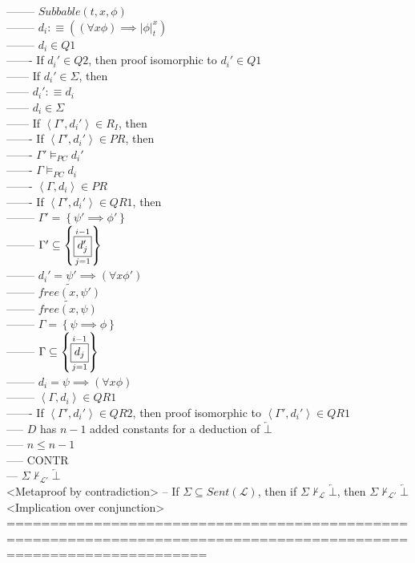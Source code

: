 \documentclass{book}
\newcommand{\is}{:\equiv}
\newcommand{\pnot}[1]{\widetilde{#1}}
\newcommand{\inot}{\not}
\newcommand{\contr}{\overleftarrow{\bot}}
\newcommand{\free}[2]{free(#1, #2)}
\newcommand{\set}[1]{\left\{ #1 \right\}}
\newcommand{\seq}[1]{\left\langle #1 \right\rangle}
\newcommand{\vdc}[3]{\underset{#2}{\overset{#3}{\fbox{$#1$}}}}
\newcommand{\sub}[3]{\left|#1\right|_{#3}^{#2}}
\begin{document}
								-------- $Subbable(t, x, \phi)$ \\
								-------- $d_i \is ((\forall x \phi) \implies \sub{\phi}{x}{t})$ \\
								-------- $d_i \in Q1$ \\
							------- If $d_i' \in Q2$, then proof isomorphic to $d_i' \in Q1$ \\
						------ If $d_i' \in \Sigma$, then \\
						------ $d_i' \is d_i$ \\
						------ $d_i \in \Sigma$ \\
						------ If $\seq{\Gamma', d_i'} \in R_I$, then \\
							------- If $\seq{\Gamma', d_i'} \in PR$, then \\
							------- $\Gamma' \vDash_{PC} d_i'$ \\
							------- $\Gamma \vDash_{PC} d_i$ \\
							------- $\seq{\Gamma, d_i} \in PR$ \\
							------- If $\seq{\Gamma', d_i'} \in QR1$, then \\
								-------- $\Gamma' = \set{\psi' \implies \phi'}$ \\
								-------- $\Gamma' \subseteq \set{\vdc{d_j'}{j=1}{i-1}}$ \\
								-------- $d_i' = \psi' \implies (\forall x \phi')$ \\
								-------- $\pnot{\free{x}{\psi'}}$ \\
								-------- $\pnot{\free{x}{\psi}}$ \\
								-------- $\Gamma = \set{\psi \implies \phi}$ \\
								-------- $\Gamma \subseteq \set{\vdc{d_j}{j=1}{i-1}}$ \\
								-------- $d_i = \psi \implies (\forall x \phi)$ \\
								-------- $\seq{\Gamma, d_i} \in QR1$ \\
							------- If $\seq{\Gamma', d_i'} \in QR2$, then proof isomorphic to $\seq{\Gamma', d_i'} \in QR1$ \\
					----- $D$ has $n-1$ added constants for a deduction of $\contr$ \\
					----- $n \leq n-1$ \\
					----- CONTR \\
			--- $\Sigma \inot \vdash_{\mathcal{L}'} \contr$ \\ <Metaproof by contradiction>
		-- If $\Sigma \subseteq Sent(\mathcal{L})$, then if $\Sigma \inot \vdash_{\mathcal{L}} \contr$, then $\Sigma \inot \vdash_{\mathcal{L}'} \contr$ \\ <Implication over conjunction>
	===================================================================================================================
\end{document}
